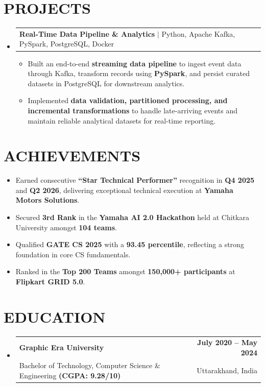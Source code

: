 \documentclass[letterpaper,10pt]{article}
\makeatletter
\renewcommand{\normalsize}{%
  \fontsize{10.1}{12.25}\selectfont
}
\newcommand{\resumeItem}[1]{
  \item\normalsize{
    {#1}
  }
}
\newcommand{\resumeSubheading}[4]{
  \item
    \begin{tabular*}{1.0\textwidth}[t]{l@{\extracolsep{\fill}}r}
      \textbf{\normalsize#1} & \textbf{\normalsize#2} \\
      {\normalsize#3} & {\normalsize#4} \\
    \end{tabular*}\vspace{1pt}
}
\newcommand{\resumeProjectHeading}[2]{
  \item
    \begin{tabular*}{1.0\textwidth}{l@{\extracolsep{\fill}}r}
      \normalsize#1 & \textbf{\normalsize#2}\\
    \end{tabular*}\vspace{0pt}
}
\newcommand{\resumeSubHeadingListStart}{\begin{itemize}[leftmargin=0.0in, label={}, itemsep=4pt, topsep=2pt]}
\newcommand{\resumeSubHeadingListEnd}{\end{itemize}}
\newcommand{\resumeItemListStart}{\begin{itemize}}
\newcommand{\resumeItemListEnd}{\end{itemize}\vspace{-3pt}}
\makeatother
\begin{document}
\section{PROJECTS}
  \resumeSubHeadingListStart
    \resumeProjectHeading
      {\textbf{Real-Time Data Pipeline \& Analytics} $|$ \textnormal{Python, Apache Kafka, PySpark, PostgreSQL, Docker}}{}
      \resumeItemListStart
        \resumeItem{Built an end-to-end \textbf{streaming data pipeline} to ingest event data through Kafka, transform records using \textbf{PySpark}, and persist curated datasets in PostgreSQL for downstream analytics.}
        \resumeItem{Implemented \textbf{data validation, partitioned processing, and incremental transformations} to handle late-arriving events and maintain reliable analytical datasets for real-time reporting.}
      \resumeItemListEnd
  \resumeSubHeadingListEnd

\section{ACHIEVEMENTS}
  \resumeItemListStart
    \resumeItem{Earned consecutive \textbf{``Star Technical Performer''} recognition in \textbf{Q4 2025} and \textbf{Q2 2026}, delivering exceptional technical execution at \textbf{Yamaha Motors Solutions}.}
    \resumeItem{Secured \textbf{3rd Rank} in the \textbf{Yamaha AI 2.0 Hackathon} held at Chitkara University amongst \textbf{104 teams}.}
    \resumeItem{Qualified \textbf{GATE CS 2025} with a \textbf{93.45 percentile}, reflecting a strong foundation in core CS fundamentals.}
    \resumeItem{Ranked in the \textbf{Top 200 Teams} amongst \textbf{150,000+ participants} at \textbf{Flipkart GRID 5.0}.}
  \resumeItemListEnd

\section{EDUCATION}
  \resumeSubHeadingListStart
    \resumeSubheading
      {Graphic Era University}{July 2020 -- May 2024}
      {Bachelor of Technology, Computer Science \& Engineering \textbf{(CGPA: 9.28/10)}}{Uttarakhand, India}
  \resumeSubHeadingListEnd
\end{document}
